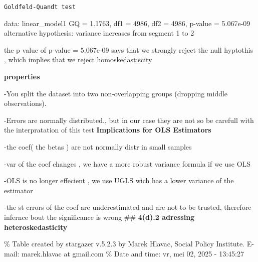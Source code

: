\documentclass[
]{article}
\begin{document}
\begin{verbatim}
Goldfeld-Quandt test
\end{verbatim}

data: linear\_model1 GQ = 1.1763, df1 = 4986, df2 = 4986, p-value =
5.067e-09 alternative hypothesis: variance increases from segment 1 to 2

the p value of p-value = 5.067e-09 says that we strongly reject the null
hyptothis , which implies that we reject homoskedastiscity

\textbf{properties}

-You split the dataset into two non-overlapping groups (dropping middle
observations).

-Errors are normally distributed., but in our case they are not so be
carefull with the interpratation of this test \textbf{Implications for
OLS Estimators}

-the coef( the betas ) are not normally distr in small samples

-var of the coef changes , we have a more robust variance formula if we
use OLS

-OLS is no longer effecient , we use UGLS wich has a lower variance of
the estimator

-the st errors of the coef are underestimated and are not to be trusted,
therefore infernce bout the significance is wrong \#\# \textbf{4(d).2
adressing heteroskedasticity}

\% Table created by stargazer v.5.2.3 by Marek Hlavac, Social Policy
Institute. E-mail: marek.hlavac at gmail.com \% Date and time: vr, mei
02, 2025 - 13:45:27
\end{document}
